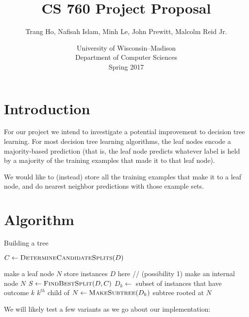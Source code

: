 \documentclass[10pt]{article}
\title{CS 760 Project Proposal}
\author{Trang Ho, Nafisah Islam, Minh Le, John Prewitt, Malcolm Reid Jr.}
\date{University of Wisconsin--Madison\\Department of Computer Sciences\\Spring 2017}
\begin{document}
\setlength{\baselineskip}{18pt}
\maketitle

\section{Introduction}
For our project we intend to investigate a potential improvement to decision tree learning. For most decision tree learning algorithms, the leaf nodes encode a majority-based prediction (that is, the leaf node predicts whatever label is held by a majority of the training examples that made it to that leaf node).  

We would like to (instead) store all the training examples that make it to a leaf node, and do nearest neighbor predictions with those example sets.

\section{Algorithm}
\begin{algorithm}
\caption{Building a tree}\label{euclid}
\begin{algorithmic}[1]

\State $C \gets \Call{DetermineCandidateSplits}{D}$

	\State make a leaf node $N$ 
	\State store instances $D$ here  // (possibility 1)
\Else
	\State make an internal node $N$ 
	\State $S \gets \Call{FindBestSplit}{D, C}$
		\State $D_k \gets$ subset of instances that have outcome $k$ 
		\State $k^{th}$ child of $N \gets \Call{MakeSubtree}{D_k}$
	\EndFor
\EndIf
\Return subtree rooted at $N$
\EndFunction
\end{algorithmic}
\end{algorithm}

We will likely test a few variants as we go about our implementation:
\end{document}
